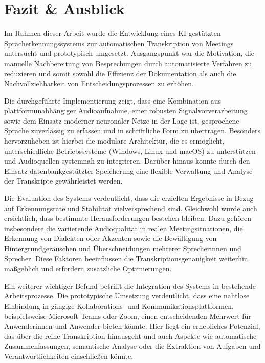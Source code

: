 
\chapter{Fazit \& Ausblick}
\label{chap:fazit_ausblick}


Im Rahmen dieser Arbeit wurde die Entwicklung eines KI-gestützten Spracherkennungssystems zur automatischen Transkription von Meetings untersucht und prototypisch umgesetzt. Ausgangspunkt war die Motivation, die manuelle Nachbereitung von Besprechungen durch automatisierte Verfahren zu reduzieren und somit sowohl die Effizienz der Dokumentation als auch die Nachvollziehbarkeit von Entscheidungsprozessen zu erhöhen.

Die durchgeführte Implementierung zeigt, dass eine Kombination aus plattformunabhängiger Audioaufnahme, einer robusten Signalvorverarbeitung sowie dem Einsatz moderner neuronaler Netze in der Lage ist, gesprochene Sprache zuverlässig zu erfassen und in schriftliche Form zu übertragen. Besonders hervorzuheben ist hierbei die modulare Architektur, die es ermöglicht, unterschiedliche Betriebssysteme (Windows, Linux und macOS) zu unterstützen und Audioquellen systemnah zu integrieren. Darüber hinaus konnte durch den Einsatz datenbankgestützter Speicherung eine flexible Verwaltung und Analyse der Transkripte gewährleistet werden.

Die Evaluation des Systems verdeutlicht, dass die erzielten Ergebnisse in Bezug auf Erkennungsrate und Stabilität vielversprechend sind. Gleichwohl wurde auch ersichtlich, dass bestimmte Herausforderungen bestehen bleiben. Dazu gehören insbesondere die variierende Audioqualität in realen Meetingsituationen, die Erkennung von Dialekten oder Akzenten sowie die Bewältigung von Hintergrundgeräuschen und Überschneidungen mehrerer Sprecherinnen und Sprecher. Diese Faktoren beeinflussen die Transkriptionsgenauigkeit weiterhin maßgeblich und erfordern zusätzliche Optimierungen.

Ein weiterer wichtiger Befund betrifft die Integration des Systems in bestehende Arbeitsprozesse. Die prototypische Umsetzung verdeutlicht, dass eine nahtlose Einbindung in gängige Kollaborations- und Kommunikationsplattformen, beispielsweise Microsoft Teams oder Zoom, einen entscheidenden Mehrwert für Anwenderinnen und Anwender bieten könnte. Hier liegt ein erhebliches Potenzial, das über die reine Transkription hinausgeht und auch Aspekte wie automatische Zusammenfassungen, semantische Analyse oder die Extraktion von Aufgaben und Verantwortlichkeiten einschließen könnte.

